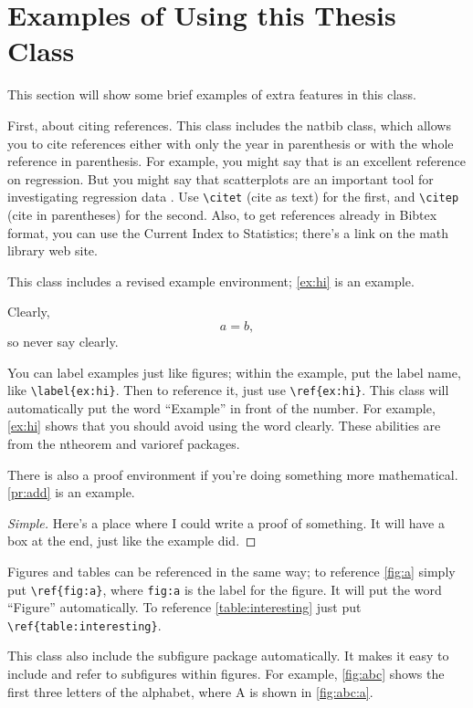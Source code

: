 \documentclass[oneside]{umnStatThesis}
\begin{document}
\chapter[Examples]{Examples of Using this Thesis Class}

This section will show some brief examples of extra features in this class.

First, about citing references.  This class includes the natbib class, which allows you to cite references either with only the year in parenthesis or with the whole reference in parenthesis.  For example, you might say that \citet{Weis:appl:2005} is an excellent reference on regression.  But you might say that scatterplots are an important tool for investigating regression data \citep{Weis:appl:2005}.  Use \verb+\citet+ (cite as text) for the first, and \verb+\citep+ (cite in parentheses) for the second.  Also, to get references already in Bibtex format, you can use the Current Index to Statistics; there's a link on the math library web site.

This class includes a revised example environment; \ref{ex:hi} is an example.
\begin{example}[Hi!]
\label{ex:hi}
Clearly,
\[a=b,\]
so never say clearly.
\end{example}
You can label examples just like figures; within the example, put the label name, like \verb+\label{ex:hi}+.  Then to reference it, just use \verb+\ref{ex:hi}+.  This class will automatically put the word ``Example'' in front of the number.  For example, \ref{ex:hi} shows that you should avoid using the word clearly.  These abilities are from the ntheorem and varioref packages.

There is also a proof environment if you're doing something more mathematical.  \ref{pr:add} is an example.
\begin{proof}[Simple]
\label{pr:add}
Here's a place where I could write a proof of something.  It will have a box at the end, just like the example did.
\end{proof}

Figures and tables can be referenced in the same way; to reference \ref{fig:a} simply put \verb+\ref{fig:a}+, where \verb+fig:a+ is the label for the figure.  It will put the word ``Figure'' automatically.  To reference \ref{table:interesting} just put \verb+\ref{table:interesting}+.

This class also include the subfigure package automatically.  It makes it easy to include and refer to subfigures within figures.  For example, \ref{fig:abc} shows the first three letters of the alphabet, where A is shown in \ref{fig:abc:a}.
\end{document}
